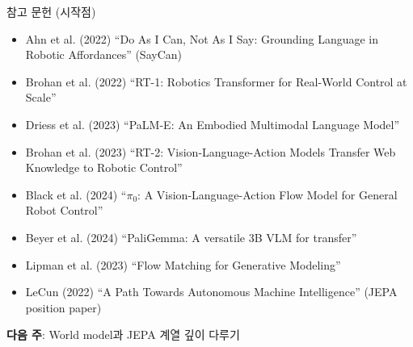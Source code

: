 \documentclass[aspectratio=169,10pt]{beamer}
\begin{document}
\begin{frame}{참고 문헌 (시작점)}
\footnotesize
\begin{itemize}
  \item Ahn et al. (2022) ``Do As I Can, Not As I Say: Grounding Language in Robotic Affordances'' (SayCan)
  \item Brohan et al. (2022) ``RT-1: Robotics Transformer for Real-World Control at Scale''
  \item Driess et al. (2023) ``PaLM-E: An Embodied Multimodal Language Model''
  \item Brohan et al. (2023) ``RT-2: Vision-Language-Action Models Transfer Web Knowledge to Robotic Control''
  \item Black et al. (2024) ``$\pi_0$: A Vision-Language-Action Flow Model for General Robot Control''
  \item Beyer et al. (2024) ``PaliGemma: A versatile 3B VLM for transfer''
  \item Lipman et al. (2023) ``Flow Matching for Generative Modeling''
  \item LeCun (2022) ``A Path Towards Autonomous Machine Intelligence'' (JEPA position paper)
\end{itemize}

\vspace{1em}
\centering
\textbf{다음 주}: World model과 JEPA 계열 깊이 다루기
\end{frame}
\end{document}
